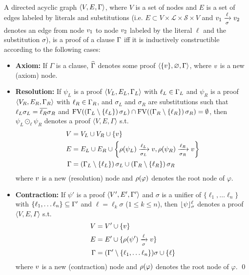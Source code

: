 \documentclass{llncs}
\begin{document}
\begin{definition} 
\label{def:proof} \hfill \\
A directed acyclic graph $\langle V, E, \Gamma \rangle$, where $V$ is a set of nodes and $E$ is a
set of edges labeled by literals and substitutions (i.e. $E \subset V \times \mathcal{L} \times \mathcal{S} \times V$ and $v_1
\xrightarrow[\sigma]{\ell} v_2$ denotes an edge from node $v_1$ to node $v_2$ labeled by the literal $\ell$ and the substitution $\sigma$), is a
proof of a clause $\Gamma$ iff it is inductively constructible according to the following cases:
%
\begin{itemize}
  \item \textbf{Axiom:} If $\Gamma$ is a clause, $\widehat{\Gamma}$ denotes some proof $\langle \{ v \}, \varnothing,
    \Gamma \rangle$, where $v$ is a new (axiom) node.
  \item \textbf{Resolution:} If $\psi_L$ is a proof $\langle V_L, E_L, \Gamma_L \rangle$ with $\ell_L \in \Gamma_L$ and
    $\psi_R$ is a proof $\langle V_R, E_R, \Gamma_R \rangle$ with $\ell_R \in \Gamma_R$, and 
    $\sigma_L$ and $\sigma_R$ are substitutions such that
    $\ell_L \sigma_L = \overline{\ell_R} \sigma_R$ and
    $\mathrm{FV}(\left( \Gamma_L \setminus \left\{ \ell_L \right\} \right) \sigma_L) \cap 
     \mathrm{FV}(\left( \Gamma_R
                    \setminus \left\{ \ell_R \right\} \right) \sigma_R) = \emptyset$, 
    then
    $\psi_L \odot_\ell \psi_R$ denotes a proof $\langle V, E, \Gamma \rangle$ s.t.
    \begin{align*}
      V &= V_L \cup V_R \cup \{v \} \\
      E &= E_L \cup E_R \cup
                    \left\{ \rho(\psi_L) \xrightarrow[\sigma_L]{\ell_L} v, 
                            \rho(\psi_R) \xrightarrow[\sigma_R]{\ell_R} v \right\} \\
     \Gamma &= \left( \Gamma_L \setminus \left\{ \ell_L \right\} \right) \sigma_L \cup \left( \Gamma_R
                    \setminus \left\{ \ell_R \right\} \right) \sigma_R 
    \end{align*}
    where $v$ is a new (resolution) node and $\rho(\varphi)$ denotes the root node of $\varphi$.
  \item \textbf{Contraction:} If $\psi'$ is a proof $\langle V', E', \Gamma' \rangle$ and $\sigma$ is a unifier of $\{\ell_1, \ldots \ell_n\}$ with $\{\ell_1, \ldots \ell_n\} \subseteq \Gamma'$ and $\ell = \ell_k \sigma$ ($1 \leq k \leq n$), 
  then $\lfloor \psi \rfloor_{\sigma}^{\ell}$ denotes a proof $\langle V, E, \Gamma \rangle$ s.t.
    \begin{align*}
      V &= V' \cup \{v \} \\
      E &= E' \cup \{ \rho(\psi') \xrightarrow[\sigma]{\ell} v \} \\
     \Gamma &= (\Gamma' \setminus \{ \ell_1, \ldots \ell_n \} ) \sigma \cup \{ \ell \}
    \end{align*}
    where $v$ is a new (contraction) node and $\rho(\varphi)$ denotes the root node of $\varphi$.
  \qed
\end{itemize}
\end{definition}
\end{document}
